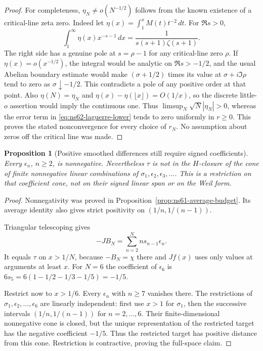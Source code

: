 \documentclass[11pt]{article}
\newtheorem{proposition}[theorem]{Proposition}
\theoremstyle{remark}
\begin{document}
\begin{proof}
For completeness, $\eta_N\ne o(N^{-1/2})$ follows from the known
existence of a critical-line zeta zero. Indeed let
$\eta(x)=\int_1^xM(t)t^{-2}\,dt$. For $\Re s>0$,
\[
 \int_1^\infty\eta(x)x^{-s-1}\,dx
        =\frac1{s(s+1)\zeta(s+1)}.
\]
The right side has a genuine pole at $s=\rho-1$ for any
critical-line zero $\rho$. If $\eta(x)=o(x^{-1/2})$, the integral
would be analytic on $\Re s>-1/2$, and the usual Abelian boundary
estimate would make $(\sigma+1/2)$ times its value at
$\sigma+i\Im\rho$ tend to zero as $\sigma\downarrow-1/2$.
This contradicts a pole of any positive order at that point.
Also $\eta(N)=\eta_N$ and
$\eta(x)-\eta(\lfloor x\rfloor)=O(1/x)$, so the discrete
little-$o$ assertion would imply the continuous one. Thus
$\limsup_N\sqrt N|\eta_N|>0$, whereas the error term in
\eqref{eq:ns62-laguerre-lower} tends to zero uniformly in $r\geq0$.
This proves the stated nonconvergence for every choice of $r_N$.
No assumption about zeros off the critical line was made.
\end{proof}

\begin{proposition}[Positive smoothed differences still require signed coefficients]
\label{prop:ns62-positive-cone}
Every $\epsilon_n$, $n\geq2$, is nonnegative. Nevertheless $\tau$
is not in the $H$-closure of the cone of finite nonnegative linear
combinations of $\sigma_1,\epsilon_2,\epsilon_3,\ldots$.
This is a restriction on that coefficient cone, not on their signed
linear span or on the Weil form.
\end{proposition}
\begin{proof}
Nonnegativity was proved in Proposition~\ref{prop:ns61-average-budget}.
Its average identity also gives strict positivity on
$(1/n,1/(n-1))$.

Triangular telescoping gives
\begin{equation}
 -JB_N=\sum_{n=2}^{N}n s_{n-1}\epsilon_n.
 \label{eq:ns62-pointwise-series}
\end{equation}
It equals $\tau$ on $x>1/N$, because $-B_N=\chi$ there and
$Jf(x)$ uses only values at arguments at least $x$.
For $N=6$ the coefficient of $\epsilon_6$ is
$6s_5=6(1-1/2-1/3-1/5)=-1/5$.

Restrict now to $x>1/6$. Every $\epsilon_n$ with $n\geq7$
vanishes there. The restrictions of
$\sigma_1,\epsilon_2,\ldots,\epsilon_6$ are linearly independent:
first use $x>1$ for $\sigma_1$, then the successive intervals
$(1/n,1/(n-1))$ for $n=2,\ldots,6$.
Their finite-dimensional nonnegative cone is closed, but the unique
representation of the restricted target has the negative coefficient
$-1/5$. Thus the restricted target has positive distance from this
cone. Restriction is contractive, proving the full-space claim.
\end{proof}
\end{document}
